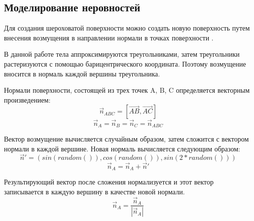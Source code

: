 \subsection{Моделирование неровностей}

Для создания шероховатой поверхности можно создать новую поверхность путем внесения возмущения в направлении нормали в точках поверхности \cite{roders}.

В данной работе тела аппроксимируются треугольниками, затем треугольники растеризуются с помощью барицентрического координата.
Поэтому возмущение вносится в нормаль каждой вершины треугольника.

Нормали поверхности, состоящей из трех точек A, B, C определяется векторным произведением:
\begin{equation}
	\overrightarrow n_{ABC} = [\overrightarrow {AB}, \overrightarrow {AC}]
\end{equation}
\begin{equation}
	 \overrightarrow n_A = \overrightarrow n_B = \overrightarrow n_C = \overrightarrow n_{ABC}
\end{equation}

Вектор возмущение вычисляется случайным образом, затем сложится с вектором нормали в каждой вершине.
Новая нормаль вычисляется следующим образом:
\begin{equation}
	\overrightarrow n' = (sin(random()), cos(random()), sin(2 * random()))
\end{equation}
\begin{equation}
	\overrightarrow n_A= \overrightarrow n_A + \overrightarrow n'
\end{equation}

Результирующий вектор после сложения нормализуется и этот вектор записывается в каждую вершину в качестве новой нормали.
\begin{equation}
	\overrightarrow n_A = \frac{\overrightarrow n_A}{|\overrightarrow n_A|}
\end{equation}
$ $

